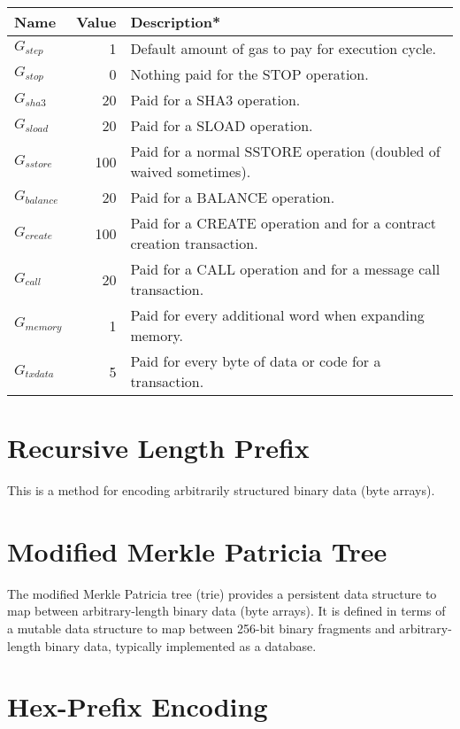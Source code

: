 \documentclass[9pt,oneside]{amsart}
\begin{document}
\begin{tabular*}{\columnwidth}[h]{lrl}
\toprule
Name & Value & Description* \\
\midrule
$G_{step}$ & 1 & Default amount of gas to pay for execution cycle. \\
$G_{stop}$ & 0 & Nothing paid for the {\small STOP} operation. \\
$G_{sha3}$ & 20 & Paid for a {\small SHA3} operation. \\
$G_{sload}$ & 20 & Paid for a {\small SLOAD} operation. \\
$G_{sstore}$ & 100 & Paid for a normal {\small SSTORE} operation (doubled of waived sometimes). \\
$G_{balance}$ & 20 & Paid for a {\small BALANCE} operation. \\
$G_{create}$ & 100 & Paid for a {\small CREATE} operation and for a contract creation transaction. \\
$G_{call}$ & 20 & Paid for a {\small CALL} operation and for a message call transaction. \\
$G_{memory}$ & 1 & Paid for every additional word when expanding memory. \\
$G_{txdata}$ & 5 & Paid for every byte of data or code for a transaction. \\
\bottomrule
\end{tabular*}


\section{Recursive Length Prefix}\label{app:rlp}

This is a method for encoding arbitrarily structured binary data (byte arrays).

\section{Modified Merkle Patricia Tree}\label{app:trie}

The modified Merkle Patricia tree (trie) provides a persistent data structure to map between arbitrary-length binary data (byte arrays). It is defined in terms of a mutable data structure to map between 256-bit binary fragments and arbitrary-length binary data, typically implemented as a database.

\section{Hex-Prefix Encoding}\label{app:hexprefix}
\end{document}
